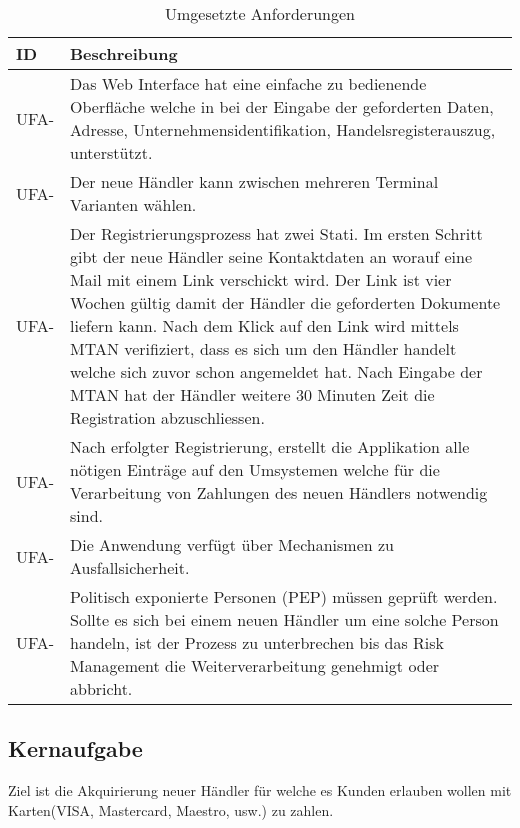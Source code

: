 \begin{table}[H]
	\centering
	\caption{Umgesetzte Anforderungen}
	\begin{tabular}{ | p{2cm} | p{13cm} | }
		\toprule
		\textbf{ID} & \textbf{Beschreibung} \\
		\midrule
		UFA-\arabic{impFuncReq} \stepcounter{impFuncReq} & Das Web Interface hat eine einfache zu bedienende Oberfläche welche in bei der Eingabe der geforderten Daten, Adresse, Unternehmensidentifikation, Handelsregisterauszug, unterstützt. \\ \hline
		UFA-\arabic{impFuncReq} \stepcounter{impFuncReq} & Der neue Händler kann zwischen mehreren Terminal Varianten wählen.\\ \hline
		UFA-\arabic{impFuncReq} \stepcounter{impFuncReq} & Der Registrierungsprozess hat zwei Stati. Im ersten Schritt gibt der neue Händler seine Kontaktdaten an worauf eine Mail mit einem Link verschickt wird. Der Link ist vier Wochen gültig damit der Händler die geforderten Dokumente liefern kann. Nach dem Klick auf den Link wird mittels MTAN verifiziert, dass es sich um den Händler handelt welche sich zuvor schon angemeldet hat. Nach Eingabe der MTAN hat der Händler weitere 30 Minuten Zeit die Registration abzuschliessen.\\ \hline
		UFA-\arabic{impFuncReq} \stepcounter{impFuncReq} & Nach erfolgter Registrierung, erstellt die Applikation alle nötigen Einträge auf den Umsystemen welche für die Verarbeitung von Zahlungen des neuen Händlers notwendig sind.\\ \hline
		UFA-\arabic{impFuncReq} \stepcounter{impFuncReq} & Die Anwendung verfügt über Mechanismen zu Ausfallsicherheit.\\ \hline
		UFA-\arabic{impFuncReq} \stepcounter{impFuncReq} & Politisch exponierte Personen (PEP) müssen geprüft werden. Sollte es sich bei einem neuen Händler um eine solche Person handeln, ist der Prozess zu unterbrechen bis das Risk Management die Weiterverarbeitung genehmigt oder abbricht.\\ 
		\bottomrule
	\end{tabular}
\end{table}

\subsection{Kernaufgabe}

Ziel ist die Akquirierung neuer Händler für welche es Kunden erlauben wollen mit Karten(VISA, Mastercard, Maestro, usw.) zu zahlen.

